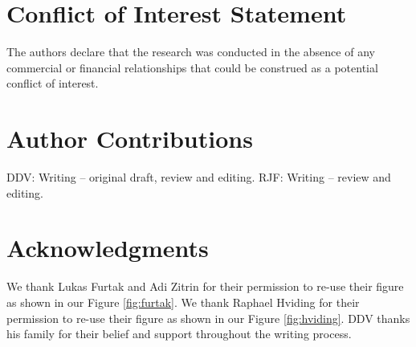 \documentclass[utf8]{FrontiersinHarvard} %
\begin{document}


\section*{Conflict of Interest Statement}

The authors declare that the research was conducted in the absence of any commercial or financial relationships that could be construed as a potential conflict of interest.

\section*{Author Contributions}
DDV: Writing -- original draft, review and editing. RJF: Writing -- review and editing.

\section*{Acknowledgments}
We thank Lukas Furtak and Adi Zitrin for their permission to re-use their figure as shown in our Figure \ref{fig:furtak}.
We thank Raphael Hviding for their permission to re-use their figure as shown in our Figure \ref{fig:hviding}.
DDV thanks his family for their belief and support throughout the writing process.


\end{document}
